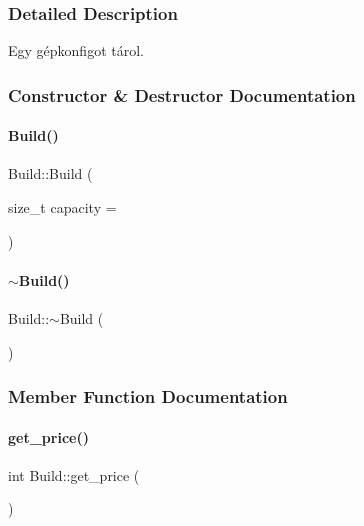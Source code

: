 \subsubsection{Detailed Description}
Egy gépkonfigot tárol. 

\subsubsection{Constructor \& Destructor Documentation}
\mbox{\label{class_build_ab9b72c3479d483c0b452af30bb544de8}} 
\paragraph{\texorpdfstring{Build()}{Build()}}
{\footnotesize\ttfamily Build\+::\+Build (\begin{DoxyParamCaption}\item[{size\+\_\+t}]{capacity = {} }\end{DoxyParamCaption})\hspace{0.3cm}{\ttfamily [inline]}}

\mbox{\label{class_build_a8f1d400e9bc158b6339cc1785b18d07b}} 
\paragraph{\texorpdfstring{$\sim$Build()}{~Build()}}
{\footnotesize\ttfamily Build\+::$\sim$\+Build (\begin{DoxyParamCaption}{ }\end{DoxyParamCaption})\hspace{0.3cm}{\ttfamily [inline]}}



\subsubsection{Member Function Documentation}
\mbox{\label{class_build_aded745a17c7d6b569244cb377ff62a9c}} 
\paragraph{\texorpdfstring{get\_price()}{get\_price()}}
{\footnotesize\ttfamily int Build\+::get\+\_\+price (\begin{DoxyParamCaption}{ }\end{DoxyParamCaption})\hspace{0.3cm}{\ttfamily [inline]}}

